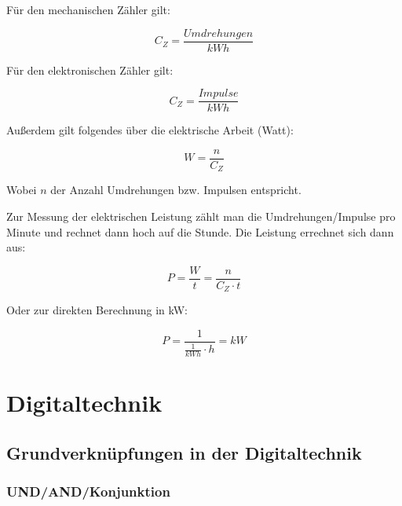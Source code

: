 \documentclass[a4paper, 12pt]{report}
\begin{document}
Für den mechanischen Zähler gilt:

\begin{center}
    \begin{equation}
	C_Z = \frac{Umdrehungen}{kWh}
    \end{equation}
\end{center}

Für den elektronischen Zähler gilt:
\begin{center}
    \begin{equation}
	C_Z = \frac{Impulse}{kWh}
    \end{equation}
\end{center}

\newpage
Außerdem gilt folgendes über die elektrische Arbeit (Watt):
\begin{center}
    \begin{equation}
	W = \frac{n}{C_Z}
    \end{equation}
\end{center}

Wobei $n$ der Anzahl Umdrehungen bzw. Impulsen entspricht.

Zur Messung der elektrischen Leistung zählt man die Umdrehungen/Impulse pro
Minute und rechnet dann hoch auf die Stunde. Die Leistung errechnet sich dann
aus:

\begin{center}
    \begin{equation}
	P = \frac{W}{t} = \frac{n}{C_Z \cdot t}
    \end{equation}
\end{center}

Oder zur direkten Berechnung in kW:

\begin{center}
    \begin{equation}
	P = \frac{1}{\frac{1}{kWh} \cdot h} = kW
    \end{equation}
\end{center}

\section{Digitaltechnik}

\subsection{Grundverknüpfungen in der Digitaltechnik}

\subsubsection{UND/AND/Konjunktion}
\end{document}
